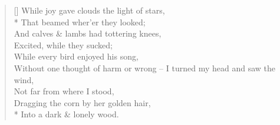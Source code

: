 \documentclass[MAIN]{subfiles}
\begin{document}
\settowidth{\versewidth}{And calves \& lambs had tottering knees,}
\begin{verse}[\versewidth]
While joy gave clouds the light of stars,\\* 
\vin That beamed wher'er they looked;\\
And calves \& lambs had tottering knees,\\
\vin Excited, while they sucked;\\
While every bird enjoyed his song,\\
Without one thought of harm or wrong --
I turned my head and saw the wind,\\
\vin Not far from where I stood,\\
Dragging the corn by her golden hair,\\*
\vin Into a dark \& lonely wood.
\end{verse}
\end{document}
